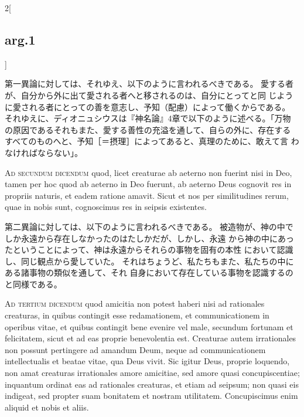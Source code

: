 \documentclass[paper=a4paper,fontsize=10pt,jafontsize=9pt,titlepage]{jlreq}
\begin{document}
\begin{paracol}{2}[\subsection{arg.1}]
\switchcolumn

第一異論に対しては、それゆえ、以下のように言われるべきである。
愛する者が、自分から外に出て愛される者へと移されるのは、自分にとってと同
 じように愛される者にとっての善を意志し、予知（配慮）によって働くからである。
それゆえに、ディオニュシウスは『神名論』4章で以下のように述べる。「万物
 の原因であるそれもまた、愛する善性の充溢を通して、自らの外に、存在する
 すべてのものへと、予知［＝摂理］によってあると、真理のために、敢えて言
 わなければならない」。

\switchcolumn*[\subsection{ad.2}]


{\scshape Ad secundum dicendum} quod, licet creaturae ab
aeterno non fuerint nisi in Deo, tamen per hoc quod ab aeterno in Deo
fuerunt, ab aeterno Deus cognovit res in propriis naturis, et eadem
ratione amavit. Sicut et nos per similitudines rerum, quae in nobis
sunt, cognoscimus res in seipsis existentes.

\switchcolumn

第二異論に対しては、以下のように言われるべきである。
被造物が、神の中でしか永遠から存在しなかったのはたしかだが、しかし、永遠
 から神の中にあったということによって、神は永遠からそれらの事物を固有の本性
 において認識し、同じ観点から愛していた。
それはちょうど、私たちもまた、私たちの中にある諸事物の類似を通して、それ
 自身において存在している事物を認識するのと同様である。

\switchcolumn*[\subsection{ad.3}]


{\scshape Ad tertium dicendum} quod amicitia non potest
haberi nisi ad rationales creaturas, in quibus contingit esse
redamationem, et communicationem in operibus vitae, et quibus contingit
bene evenire vel male, secundum fortunam et felicitatem, sicut et ad eas
proprie benevolentia est. Creaturae autem irrationales non possunt
pertingere ad amandum Deum, neque ad communicationem intellectualis et
beatae vitae, qua Deus vivit. Sic igitur Deus, proprie loquendo, non
amat creaturas irrationales amore amicitiae, sed amore quasi
concupiscentiae; inquantum ordinat eas ad rationales creaturas, et etiam
ad seipsum; non quasi eis indigeat, sed propter suam bonitatem et
nostram utilitatem. Concupiscimus enim aliquid et nobis et aliis.


\end{paracol}
\end{document}
